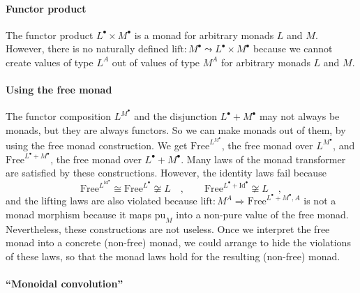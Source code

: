 \paragraph{Functor product}

The functor product $L^{\bullet}\times M^{\bullet}$ is a monad for
arbitrary monads $L$ and $M$. However, there is no naturally defined
$\text{lift}:M^{\bullet}\leadsto L^{\bullet}\times M^{\bullet}$ because
we cannot create values of type $L^{A}$ out of values of type $M^{A}$
for arbitrary monads $L$ and $M$.

\paragraph{Using the free monad}

The functor composition $L^{M^{\bullet}}$ and the disjunction $L^{\bullet}+M^{\bullet}$
may not always be monads, but they are always functors. So we can
make monads out of them, by using the free monad construction. We
get $\text{Free}^{L^{M^{\bullet}}}$, the free monad over $L^{M^{\bullet}}$,
and $\text{Free}^{L^{\bullet}+M^{\bullet}}$, the free monad over
$L^{\bullet}+M^{\bullet}$. Many laws of the monad transformer are
satisfied by these constructions. However, the identity laws fail
because
\[
\text{Free}^{L^{\text{Id}^{\bullet}}}\cong\text{Free}^{L^{\bullet}}\not\cong L\quad,\quad\quad\text{Free}^{L^{\bullet}+\text{Id}^{\bullet}}\not\cong L\quad,
\]
and the lifting laws are also violated because $\text{lift}:M^{A}\Rightarrow\text{Free}^{L^{\bullet}+M^{\bullet},A}$
is not a monad morphism because it maps $\text{pu}_{M}$ into a non-pure
value of the free monad. Nevertheless, these constructions are not
useless. Once we interpret the free monad into a concrete (non-free)
monad, we could arrange to hide the violations of these laws, so that
the monad laws hold for the resulting (non-free) monad.

\paragraph{``Monoidal convolution''}

